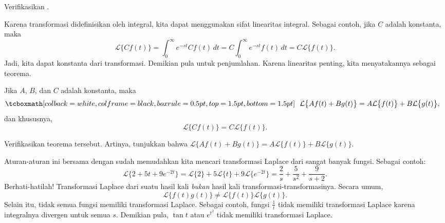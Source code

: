\begin{exercise}
Verifikasikan .
\end{exercise}

Karena transformasi didefinisikan oleh integral, kita dapat menggunakan sifat
linearitas integral.  Sebagai contoh, jika $C$ adalah konstanta, maka
\begin{equation*}
\mathcal{L} \bigl\{ C f(t) \bigr\} =
\int_0^\infty e^{-st} C f(t) \,dt =
C \int_0^\infty e^{-st} f(t) \,dt =
C \mathcal{L} \bigl\{ f(t) \bigr\} .
\end{equation*}
Jadi, kita dapat  konstanta dari transformasi.
Demikian pula untuk penjumlahan.
Karena linearitas penting, kita menyatakannya sebagai teorema.

\begin{theorem}
Jika $A$, $B$, dan $C$ adalah konstanta, maka
\begin{equation*}
\mybxbg{~~
\mathcal{L} \bigl\{ A f(t) + B g(t) \bigr\} =
A \mathcal{L} \bigl\{ f(t) \bigr\} +
B \mathcal{L} \bigl\{ g(t) \bigr\} ,
~~}
\end{equation*}
dan khususnya,
\begin{equation*}
\mathcal{L} \bigl\{ C f(t) \bigr\} =
C \mathcal{L} \bigl\{ f(t) \bigr\} .
\end{equation*}
\end{theorem}

\begin{exercise}
Verifikasikan teorema tersebut.  Artinya, tunjukkan bahwa
$\mathcal{L} \bigl\{ A f(t) + B g(t) \bigr\} =
A \mathcal{L} \bigl\{ f(t) \bigr\} +
B \mathcal{L} \bigl\{ g(t) \bigr\}$.
\end{exercise}

Aturan-aturan ini bersama dengan  sudah memudahkan kita mencari
transformasi Laplace dari sangat banyak fungsi.
Sebagai contoh:
\begin{equation*}
\mathcal{L}\bigl\{
2 + 5t + 9e^{-2t}
\bigr\}
=
\mathcal{L}\bigl\{
2
\bigr\}
+5
\mathcal{L}\bigl\{
t
\bigr\}
+
9
\mathcal{L}\bigl\{
e^{-2t}
\bigr\}
=
\frac{2}{s} + \frac{5}{s^2} + \frac{9}{s+2} .
\end{equation*}
Berhati-hatilah!
Transformasi Laplace dari suatu hasil kali
\emph{bukan} hasil kali transformasi-transformasinya.  Secara umum, 
\begin{equation*}
\mathcal{L} \bigl\{ f(t) g(t) \bigr\} \neq
\mathcal{L} \bigl\{ f(t) \bigr\}
\mathcal{L} \bigl\{ g(t) \bigr\} .
\end{equation*}
Selain itu, tidak semua fungsi memiliki transformasi Laplace.  Sebagai
contoh, fungsi $\frac{1}{t}$ tidak memiliki transformasi Laplace karena
integralnya divergen untuk semua $s$.  Demikian pula,
$\tan t$ atau $e^{t^2}$ tidak memiliki transformasi Laplace.

